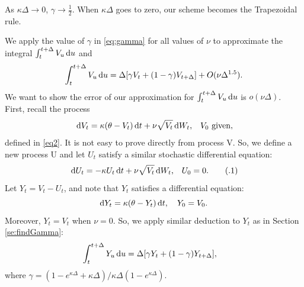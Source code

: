 \documentclass{ws-ijfe}
\newcommand\numberthis{\addtocounter{equation}{1}\tag{\theequation}}
\begin{document}
As $\kappa\Delta\rightarrow 0$, $\gamma\rightarrow\frac{1}{2} $.
When $\kappa\Delta$ goes to zero, our scheme becomes the Trapezoidal rule.

We apply the value of $\gamma$ in \eqref{eq:gamma} for all values of $\nu$ to approximate the integral $\int_{t}^{t+\Delta}V_u \,\mathrm{d} u$ and
\begin{equation*}
  \int_{t}^{t+\Delta}V_u\,\mathrm{d} u = \Delta[\gamma V_t+(1-\gamma) V_{t+\Delta}] + O(\nu\Delta^{1.5}).
\end{equation*}
We want to show the error of our approximation for $ \int_{t}^{t+\Delta}V_u\,\mathrm{d} u$ is $o(\nu\Delta)$. 
First, recall the process
\begin{equation*}
  \,\mathrm{d} V_t = \kappa(\theta-V_t)\,\mathrm{d} t +\nu\sqrt{V_t}\,\mathrm{d} W_t\text{,} \quad V_0 \text{ given},
\end{equation*}
defined in \eqref{eq2}. It is not easy to prove directly from process V. So, we define a new process U and let $U_t$ satisfy a similar stochastic differential equation:
\begin{equation*}
  \,\d U_t = -\kappa U_t\,\d t + \nu\sqrt{V_t}\,\d W_t\text{,} \quad U_0 = 0.\numberthis\label{appeqnV_t}
\end{equation*}
Let $Y_t=V_t-U_t$, and note that $Y_t$ satisfies a differential equation:
\begin{equation*}
  \mathrm{d} Y_t = \kappa(\theta-Y_t)\,\mathrm{d} t, \quad Y_0 = V_0.
\end{equation*}
Moreover, $Y_t=V_t$ when $\nu = 0$. So, we apply similar deduction to $Y_t$ as in Section \ref{se:findGamma}:
\begin{align*}
   \int^{t+\Delta}_t Y_u\,\d u %
    &= \Delta[\gamma Y_t+(1-\gamma)Y_{t+\Delta}],
\end{align*}
where $\gamma = (1-e^{\kappa\Delta}+\kappa\Delta)\big/\kappa\Delta(1-e^{\kappa\Delta})$.
\end{document}
